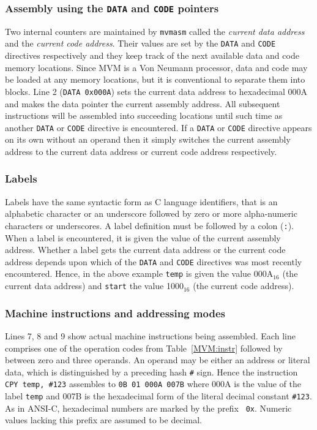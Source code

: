 \subsubsection{Assembly using the {\tt DATA} and {\tt CODE} pointers}

Two internal counters are maintained by {\tt mvmasm} called the {\em
current data address} and the {\em current code address}. Their values
are set by the {\tt DATA} and {\tt CODE} directives respectively and
they keep track of the next available data and code memory locations.
Since MVM is a Von Neumann processor, data and code may be loaded at any
memory locations, but it is conventional to separate them into blocks.
Line 2 ({\tt DATA 0x000A}) sets the current data address to hexadecimal
000A and makes the data pointer the current assembly address. All
subsequent instructions will be assembled into succeeding locations
until such time as another {\tt DATA} or {\tt CODE} directive is
encountered. If a {\tt DATA} or {\tt CODE} directive appears on its own
without an operand then it simply switches the current assembly address
to the current data address or current code address respectively.

\subsubsection{Labels}
Labels have the same syntactic form as C language identifiers, that is
an alphabetic character or an underscore followed by zero or more
alpha-numeric characters or underscores. A label definition must be followed by a
colon ({\tt :}). When a label is encountered, it is given the value of
the current assembly address. Whether a label gets the current data address or the
current code address depends upon which of the {\tt DATA} and {\tt CODE} directives was
most recently encountered. Hence, in the above example {\tt temp} is
given the value 000A$_{16}$ (the current data address)
and {\tt start} the value 1000$_{16}$ (the current code address).

\subsubsection{Machine instructions and addressing modes}
Lines 7, 8 and 9 show actual machine instructions being assembled. Each
line comprises one of the operation codes from Table~\ref{MVM:instr}
followed by between zero and three operands. An operand may be either an
address or literal data, which is distinguished by a preceding hash 
\verb+#+ sign. Hence the instruction \verb+CPY temp, #123+ assembles to
{\tt 0B~01~000A~007B} where 000A is the value of the label {\tt temp}
and 007B is the hexadecimal form of the literal decimal constant 
\verb+#123+. As in ANSI-C, hexadecimal numbers are marked by the prefix {\tt
0x}. Numeric values lacking this prefix are assumed to be decimal.

